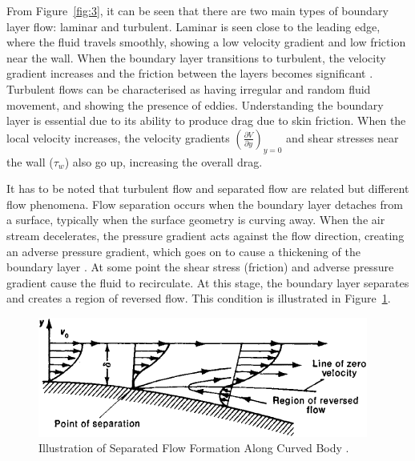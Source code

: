  
\noindent From Figure~\ref{fig:3}, it can be seen that there are two main types of boundary layer flow: laminar and turbulent. Laminar is seen close to the leading edge, where the fluid travels smoothly, showing a low velocity gradient and low friction near the wall. When the boundary layer transitions to turbulent, the velocity gradient increases and the friction between the layers becomes significant \cite{Scibor-Rylski1984RoadAerodynamics}. Turbulent flows can be characterised as having irregular and random fluid movement, and showing the presence of eddies. Understanding the boundary layer is essential due to its ability to produce drag due to skin friction. When the local velocity increases, the velocity gradients $(\frac{\partial V}{\partial y})_{y=0} $ and shear stresses near the wall ($\tau_w $) also go up, increasing the overall drag.

\noindent It has to be noted that turbulent flow and separated flow are related but different flow phenomena. Flow separation occurs when the boundary layer detaches from a surface, typically when the surface geometry is curving away. When the air stream decelerates, the pressure gradient acts against the flow direction, creating an adverse pressure gradient, which goes on to cause a thickening of the boundary layer \cite{Scibor-Rylski1984RoadAerodynamics}. At some point the shear stress (friction) and adverse pressure gradient cause the fluid to recirculate. At this stage, the boundary layer separates and creates a region of reversed flow. This condition is illustrated in Figure~\ref{fig:flow separation}.

\begin{figure}[!ht]
    \centering
    \includegraphics[scale= 0.72]{Figures/flow_separation.png}
    \caption{Illustration of Separated Flow Formation Along Curved Body \cite{Anonymous1979SeparationDictionary}.}
    \label{fig:flow separation}
\end{figure}

